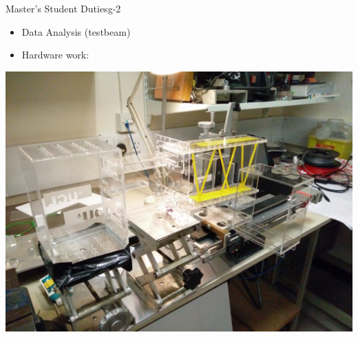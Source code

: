 \documentclass{beamer}
\begin{document}
\begin{frame}{Master's Student Duties}{g-2}
\begin{itemize}
\item Data Analysis (testbeam) 
\item Hardware work:
\end{itemize}
\centering
\includegraphics[height=.5\textwidth]{figures/stand.jpg}

\end{frame}
\end{document}
